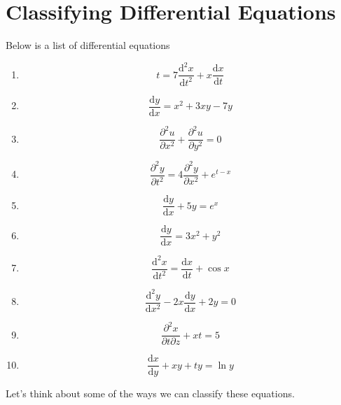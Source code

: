 \section{Classifying Differential Equations}
\noindent
Below is a list of differential equations
\begin{enumerate}
	\item \begin{equation*}
		t = 7\frac{\mathrm{d}^2 x}{\mathrm{d} t^2} + x\frac{\mathrm{d} x}{\mathrm{d} t}
	\end{equation*}
	\item \begin{equation*}
		\frac{\mathrm{d}y}{\mathrm{d}x} = x^2 + 3xy -7y
	\end{equation*}
	\item \begin{equation*}
		\frac{\partial^2 u}{\partial x^2} + \frac{\partial^2 u}{\partial y^2} = 0
	\end{equation*}
	\item \begin{equation*}
		\frac{\partial^2 y}{\partial t^2} = 4\frac{\partial^2 y}{\partial x^2} + e^{t-x}
	\end{equation*}
	\item \begin{equation*}
		\frac{\mathrm{d} y}{\mathrm{d} x} + 5y = e^x
	\end{equation*}
	\item \begin{equation*}
		\frac{\mathrm{d} y}{\mathrm{d} x} = 3x^2 + y^2
	\end{equation*}
	\item \begin{equation*}
		\frac{\mathrm{d}^2 x}{\mathrm{d} t^2} = \frac{\mathrm{d}x}{\mathrm{d}t} + \cos{x}
	\end{equation*}
	\item \begin{equation*}
		\frac{\mathrm{d}^2 y}{\mathrm{d} x^2} - 2x\frac{\mathrm{d} y}{\mathrm{d} x} + 2y = 0
	\end{equation*}
	\item \begin{equation*}
		\frac{\partial^2 x}{\partial t \partial z} + xt = 5
	\end{equation*}
	\item \begin{equation*}
		\frac{\mathrm{d} x}{\mathrm{d}y} + xy + ty = \ln{y}
	\end{equation*}
\end{enumerate}
Let's think about some of the ways we can classify these equations.





